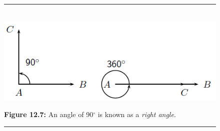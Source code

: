     \setcounter{subfigure}{0}
	\begin{figure}[H] %
    \begin{center}
    \rule[.1in]{\figurerulewidth}{.005in} \\
        \label{m39370*uid18!!!underscore!!!media}\label{m39370*uid18!!!underscore!!!printimage}\includegraphics[width=.8\columnwidth]{col11306.imgs/m39370_MG10C13_007.png} %
      \vspace{2pt}
    \vspace{\rubberspace}\par \begin{cnxcaption}
	  \small \textbf{Figure 12.7: }An angle of 90\begin{math}{}^{\circ }\end{math} is known as a \textsl{right angle}.
	\end{cnxcaption}
    \vspace{.1in}
    \rule[.1in]{\figurerulewidth}{.005in} \\
    \end{center}
 \end{figure}       
\label{m39370*secfhsst!!!underscore!!!id210}
